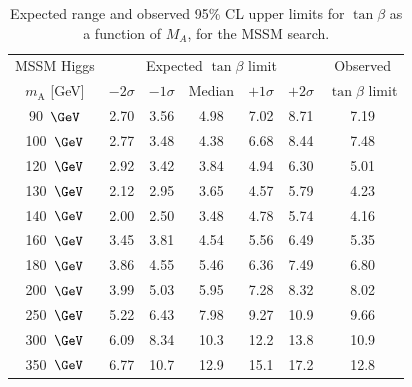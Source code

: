 \begin{table}[!h]
  \begin{center}
    \caption{Expected range and observed 95\% CL upper limits for
             $\tan\beta$ as a function of $M_A$, for the MSSM search.
}
\begin{tabular}{|c|c|c|c|c|c|c|}
\cline{2-7}
\multicolumn{1}{c}{MSSM Higgs}      & \multicolumn{5}{|c|}{Expected $\tan\beta$ limit}   &  Observed \\
\cline{1-6}
  $m_\mathrm{A}$ [GeV] &$-2\sigma$  &   $-1\sigma$ &        Median &    $+1\sigma$ &  $+2\sigma$ & $\tan\beta$ limit \\ 
\hline
                90~$\GeV$ &            2.70 &            3.56 &            4.98 &            7.02 &            8.71 &            7.19  \\
\hline
               100~$\GeV$ &            2.77 &            3.48 &            4.38 &            6.68 &            8.44 &            7.48  \\
\hline
               120~$\GeV$ &            2.92 &            3.42 &            3.84 &            4.94 &            6.30 &            5.01  \\
\hline
               130~$\GeV$ &            2.12 &            2.95 &            3.65 &            4.57 &            5.79 &            4.23  \\
\hline
               140~$\GeV$ &            2.00 &            2.50 &            3.48 &            4.78 &            5.74 &            4.16  \\
\hline
               160~$\GeV$ &            3.45 &            3.81 &            4.54 &            5.56 &            6.49 &            5.35  \\
\hline
               180~$\GeV$ &            3.86 &            4.55 &            5.46 &            6.36 &            7.49 &            6.80  \\
\hline
               200~$\GeV$ &            3.99 &            5.03 &            5.95 &            7.28 &            8.32 &            8.02  \\
\hline
               250~$\GeV$ &            5.22 &            6.43 &            7.98 &            9.27 &           10.9 &            9.66  \\
\hline
               300~$\GeV$ &            6.09 &            8.34 &           10.3 &           12.2 &           13.8 &           10.9  \\
\hline
               350~$\GeV$ &            6.77 &           10.7 &           12.9 &           15.1 &           17.2 &           12.8  \\

\end{tabular}
\end{center}
\end{table}
